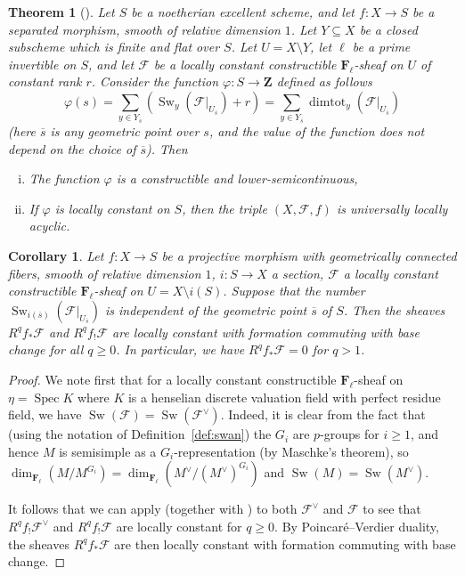 \documentclass[twoside]{amsart}
\newcommand{\FF}{\mathbf{F}}
\newcommand{\ZZ}{\mathbf{Z}}
\newcommand{\Ff}{\mathscr{F}}
\DeclareMathOperator{\Spec}{Spec}
\DeclareMathOperator{\Swan}{Sw}
\DeclareMathOperator{\dimtot}{dimtot}
\renewcommand{\phi}{\varphi}
\renewcommand{\to}{\longrightarrow}
\renewcommand{\bar}{\overline}
\theoremstyle{plain}
\newtheorem{theorem}[subsubsection]{Theorem}
\newtheorem{corollary}[subsubsection]{Corollary}
\theoremstyle{definition}
\theoremstyle{remark}
\numberwithin{equation}{subsection}
\begin{document}
\begin{theorem}[{\cite[Th\'eor\`eme 2.1.1]{Laumon}}] 
	Let $S$ be a noetherian excellent scheme, and let $f\colon X\to S$ be a separated morphism, smooth of relative dimension $1$. Let $Y\subseteq X$ be a closed subscheme which is finite and flat over $S$. Let $U=X\setminus Y$, let $\ell$ be a prime invertible on $S$, and let $\Ff$ be a locally constant constructible $\FF_\ell$-sheaf on $U$ of constant rank $r$. Consider the function $\phi\colon S\to \ZZ$ defined as follows
	\[ 
		\phi(s) = \sum_{y\in Y_{\bar s}} \left(\Swan_y(\Ff|_{U_{\bar s}}) + r\right)  = \sum_{y\in Y_{\bar s}} \dimtot_y (\Ff|_{U_{\bar s}})
	\]
	(here $\bar s$ is any geometric point over $s$, and the value of the function does not depend on the choice of $\bar s$). Then 
	\begin{enumerate}[(i)]
		\item The function $\phi$ is a constructible and lower-semicontinuous,
		\item If $\phi$ is locally constant on $S$, then the triple $(X, \Ff, f)$ is universally locally acyclic.
	\end{enumerate}
\end{theorem}

\begin{corollary}\label{cor:deligne-laumon}
	Let $f\colon X\to S$ be a projective morphism with geometrically connected fibers, smooth of relative dimension $1$, $i\colon S\to X$ a section, $\Ff$ a locally constant constructible $\FF_\ell$-sheaf on $U=X\setminus i(S)$. Suppose that the number $\Swan_{i(\bar s)}(\Ff|_{U_{\bar s}})$ is independent of the geometric point $\bar s$ of $S$. Then the sheaves $R^q f_* \Ff$ and $R^q f_! \Ff$ are locally constant with formation commuting with base change for all $q\geq 0$. In particular, we have $R^q f_* \Ff = 0$ for $q>1$.
\end{corollary}

\begin{proof}
We note first that for a locally constant constructible $\FF_\ell$-sheaf on $\eta=\Spec K$ where $K$ is a henselian discrete valuation field with perfect residue field, we have $\Swan(\Ff) = \Swan(\Ff^\vee)$. Indeed, it is clear from the fact that (using the notation of Definition~\ref{def:swan}) the $G_i$ are $p$-groups for $i\geq 1$, and hence $M$ is semisimple as a $G_i$-representation (by Maschke's theorem), so $\dim_{\FF_\ell} (M/M^{G_i}) = \dim_{\FF_\ell} (M^\vee/(M^\vee)^{G_i})$ and $\Swan(M) = \Swan(M^\vee)$.

It follows that we can apply \cite[Corollaire 2.1.2]{Laumon} (together with \cite[Remarque 2.1.3]{Laumon}) to both $\Ff^\vee$ and $\Ff$ to see that $R^q f_! \Ff^\vee$ and $R^q f_! \Ff$ are locally constant for $q\geq 0$. By Poincar\'e--Verdier duality, the sheaves $R^q f_* \Ff$ are then locally constant with formation commuting with base change.
\end{proof}
\end{document}
